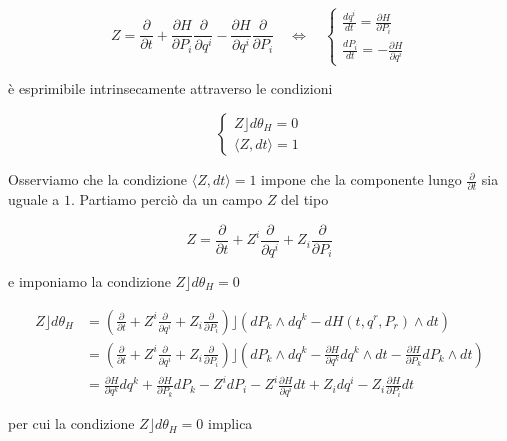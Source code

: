 \begin{equation*}
Z = \frac{\partial}{\partial  t} + \frac{\partial H}{\partial P_i}\frac{\partial}{\partial q^i} - \frac{\partial H}{\partial q^i}\frac{\partial}{\partial P_i} \quad \Leftrightarrow \quad 
\begin{cases}
\frac{dq^i}{dt} = \frac{\partial H}{\partial P_i}\\
\frac{dP_i}{dt} = - \frac{\partial H}{\partial q^i}
\end{cases}
\end{equation*}

è esprimibile intrinsecamente attraverso le condizioni

\begin{equation*}
\begin{cases}
Z \rfloor d \theta_{H} = 0 \\
\langle Z,dt \rangle =1
\end{cases}
\end{equation*}

Osserviamo che la condizione $ \langle Z,dt \rangle =1 $ impone che la componente lungo $ \frac{\partial}{\partial t} $ sia uguale a $ 1 $. Partiamo perciò da un campo $ Z $ del tipo

\begin{equation*}
Z = \frac{\partial}{\partial  t} + Z^i\frac{\partial}{\partial q^i} + Z_i\frac{\partial}{\partial P_i}
\end{equation*}

e imponiamo la condizione $ Z \rfloor d \theta_{H} = 0 $

\begin{equation*}
\begin{split}
Z \rfloor d \theta_{H} &= \left( \frac{\partial}{\partial  t} + Z^i\frac{\partial}{\partial q^i} + Z_i\frac{\partial}{\partial P_i}\right) \rfloor (dP_k \wedge dq^k - dH(t, q^r, P_r) \wedge dt)\\
&= \left( \frac{\partial}{\partial  t} + Z^i\frac{\partial}{\partial q^i} + Z_i\frac{\partial}{\partial P_i}\right) \rfloor \left(dP_k \wedge dq^k - \frac{\partial H}{\partial q^k}dq^k \wedge dt - \frac{\partial H}{\partial P_k}dP_k \wedge dt \right)\\
&= \frac{\partial H}{\partial q^k}dq^k + \frac{\partial H}{\partial P_k}dP_k - Z^idP_i - Z^i \frac{\partial H}{\partial q^i}dt + Z_idq^i - Z_i\frac{\partial H}{\partial P_i}dt
\end{split}
\end{equation*}

per cui la condizione $ Z \rfloor d \theta_{H} = 0 $ implica

